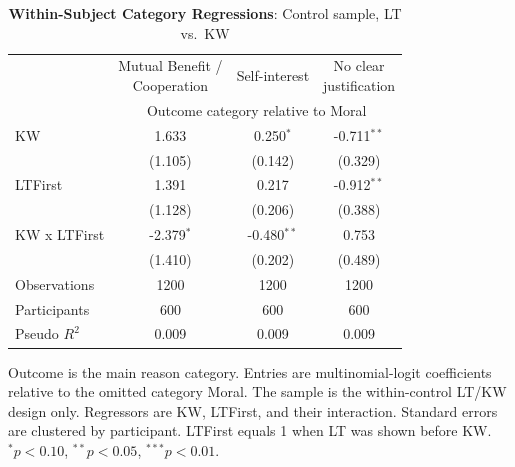 \begin{table}[!htbp]
\centering
\caption{\textbf{Within-Subject Category Regressions}: Control sample, LT vs.\ KW}
\label{tab:within_control_category_regressions}
\begin{tabular}{lccc}
\toprule
 & \shortstack{Mutual Benefit /\\ Cooperation} & Self-interest & \shortstack{No clear\\ justification} \\
 & \multicolumn{3}{c}{Outcome category relative to Moral} \\
\cmidrule(lr){2-4}
\midrule
KW & 1.633 & 0.250$^{*}$ & -0.711$^{**}$ \\
 & (1.105) & (0.142) & (0.329) \\
LTFirst & 1.391 & 0.217 & -0.912$^{**}$ \\
 & (1.128) & (0.206) & (0.388) \\
KW x LTFirst & -2.379$^{*}$ & -0.480$^{**}$ & 0.753 \\
 & (1.410) & (0.202) & (0.489) \\
Observations & 1200 & 1200 & 1200 \\
Participants & 600 & 600 & 600 \\
Pseudo $R^2$ & 0.009 & 0.009 & 0.009 \\
\bottomrule
\end{tabular}
\begin{flushleft}
\footnotesize Outcome is the main reason category. Entries are multinomial-logit coefficients relative to the omitted category Moral. The sample is the within-control LT/KW design only. Regressors are KW, LTFirst, and their interaction. Standard errors are clustered by participant. LTFirst equals 1 when LT was shown before KW\@. $^{*}p<0.10$, $^{**}p<0.05$, $^{***}p<0.01$.
\end{flushleft}
\end{table}